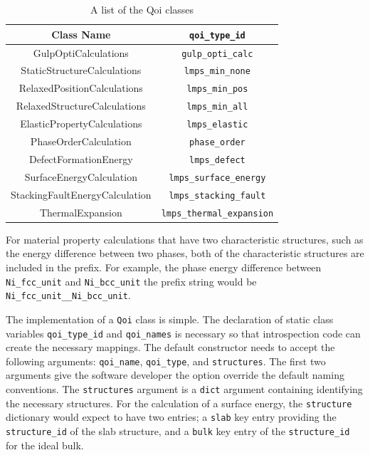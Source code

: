 \begin{table}[ht]
	\centering
	\caption{A list of the Qoi classes}
	\label{tbl:pypospack_qoi_classes}
	\begin{tabular}{cc}
		\hline
		Class Name
		  & \verb|qoi_type_id| \\
		\hline
    GulpOptiCalculations
		   & \verb|gulp_opti_calc| \\
		StaticStructureCalculations
		   & \verb|lmps_min_none| \\
		RelaxedPositionCalculations
		   & \verb|lmps_min_pos| \\
		RelaxedStructureCalculations
		   & \verb|lmps_min_all| \\
    ElasticPropertyCalculations
		   & \verb|lmps_elastic| \\
		PhaseOrderCalculation
		   & \verb|phase_order| \\
		DefectFormationEnergy
		   & \verb|lmps_defect| \\
		SurfaceEnergyCalculation
		   & \verb|lmps_surface_energy|  \\
		StackingFaultEnergyCalculation
			 & \verb|lmps_stacking_fault| \\
		ThermalExpansion
			 & \verb|lmps_thermal_expansion| \\
		\hline
	\end{tabular}
\end{table}


For material property calculations that have two characteristic structures, such as the energy difference between two phases, both of the characteristic structures are included in the prefix.  For example, the phase energy difference between \verb|Ni_fcc_unit| and \verb|Ni_bcc_unit| the prefix string would be \verb|Ni_fcc_unit__Ni_bcc_unit|.

The implementation of a \verb|Qoi| class is simple.  The declaration of static class variables \verb|qoi_type_id| and \verb|qoi_names| is necessary so that introspection code can create the necessary mappings.   The default constructor needs to accept the following arguments: \verb|qoi_name|, \verb|qoi_type|, and \verb|structures|.   The first two arguments give the software developer the option override the default naming conventions.  The \verb|structures| argument is a \verb|dict| argument containing identifying the necessary structures.  For the calculation of a surface energy, the \verb|structure| dictionary would expect to have two entries; a \verb|slab| key entry providing the \verb|structure_id| of the slab structure, and a \verb|bulk| key entry of the \verb|structure_id| for the ideal bulk.

